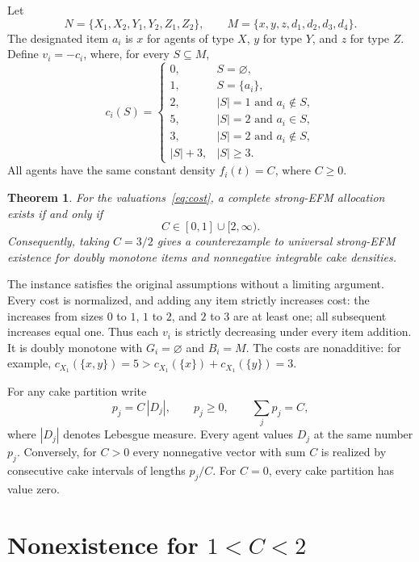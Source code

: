 \documentclass[11pt,a4paper]{article}
\newtheorem{theorem}{Theorem}
\begin{document}
Let
\[
 N=\{X_1,X_2,Y_1,Y_2,Z_1,Z_2\},\qquad
 M=\{x,y,z,d_1,d_2,d_3,d_4\}.
\]
The designated item $a_i$ is $x$ for agents of type $X$, $y$ for type
$Y$, and $z$ for type $Z$. Define $v_i=-c_i$, where, for every $S\subseteq M$,
\begin{equation}\label{eq:cost}
 c_i(S)=
 \begin{cases}
 0,&S=\varnothing,\\
 1,&S=\{a_i\},\\
 2,&|S|=1\text{ and }a_i\notin S,\\
 5,&|S|=2\text{ and }a_i\in S,\\
 3,&|S|=2\text{ and }a_i\notin S,\\
 |S|+3,&|S|\geq3.
 \end{cases}
\end{equation}
All agents have the same constant density $f_i(t)=C$, where $C\geq0$.

\begin{theorem}\label{thm:main}
For the valuations~\eqref{eq:cost}, a complete strong-EFM allocation
exists if and only if
\[
 C\in[0,1]\cup[2,\infty).
\]
Consequently, taking $C=3/2$ gives a counterexample to universal strong-EFM
existence for doubly monotone items and nonnegative integrable cake densities.
\end{theorem}

The instance satisfies the original assumptions without a limiting
argument. Every cost is normalized, and adding any item strictly
increases cost: the increases from sizes $0$ to $1$, $1$ to $2$, and
$2$ to $3$ are at least one; all subsequent increases equal one.
Thus each $v_i$ is strictly decreasing under every item addition.
It is doubly monotone with $G_i=\varnothing$ and $B_i=M$.
The costs are nonadditive: for example,
$c_{X_1}(\{x,y\})=5>c_{X_1}(\{x\})+c_{X_1}(\{y\})=3$.

For any cake partition write
\begin{equation}\label{eq:payments}
 p_j=C\,|D_j|,\qquad p_j\geq0,\qquad \sum_jp_j=C,
\end{equation}
where $|D_j|$ denotes Lebesgue measure. Every agent values $D_j$ at the
same number $p_j$. Conversely, for $C>0$ every nonnegative vector with
sum $C$ is realized by consecutive cake intervals of lengths $p_j/C$.
For $C=0$, every cake partition has value zero.

\section{Nonexistence for \texorpdfstring{$1<C<2$}{1<C<2}}
\end{document}
